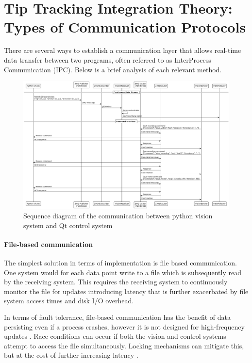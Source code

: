 \section{Tip Tracking Integration Theory: Types of Communication Protocols}

There are several ways to establish a communication layer that allows real-time data transfer between two programs, often referred to as InterProcess Communication (IPC). Below is a brief analysis of each relevant method.

\begin{figure} [H]
    \centering
    \includegraphics[width=1.1\linewidth]{images/Software documentation/visionSequencediag.png}
    \caption{Sequence diagram of the communication between python vision system and Qt control system}
    \label{fig:seqComm}
\end{figure}


\paragraph*{File-based communication}
The simplest solution in terms of implementation is file based communication. One system would for each data point write to a file which is subsequently read by the receiving system. This requires the receiving system to continuously monitor the file for updates introducing latency that is further exacerbated by file system access times and disk I/O overhead. 

In terms of fault tolerance, file-based communication has the benefit of data persisting even if a process crashes, however it is not designed for high-frequency updates \cite{gray_interprocess_2003}. Race conditions can occur if both the vision and control systems attempt to access the file simultaneously. Locking mechanisms can mitigate this, but at the cost of further increasing latency \cite{gray_interprocess_2003}. 

